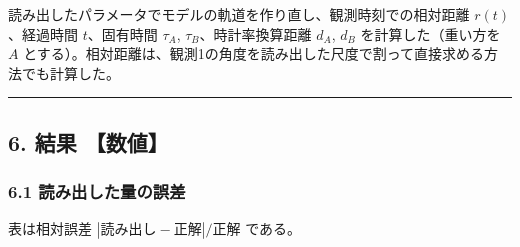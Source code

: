 \documentclass[
  a4paper,
]{ltjsarticle}
\begin{document}
読み出したパラメータでモデルの軌道を作り直し、観測時刻での相対距離
\(r(t)\)、経過時間 \(t\)、固有時間 \(\tau_A\),
\(\tau_B\)、時計率換算距離 \(d_A\), \(d_B\) を計算した（重い方を \(A\)
とする）。相対距離は、観測1の角度を読み出した尺度で割って直接求める方法でも計算した。

\begin{center}\rule{0.5\linewidth}{0.5pt}\end{center}

\subsection{6. 結果 【数値】}\label{ux7d50ux679c-ux6570ux5024}

\subsubsection{6.1
読み出した量の誤差}\label{ux8aadux307fux51faux3057ux305fux91cfux306eux8aa4ux5dee}

表は相対誤差 \(|\text{読み出し}-\text{正解}|/\text{正解}\) である。
\end{document}
